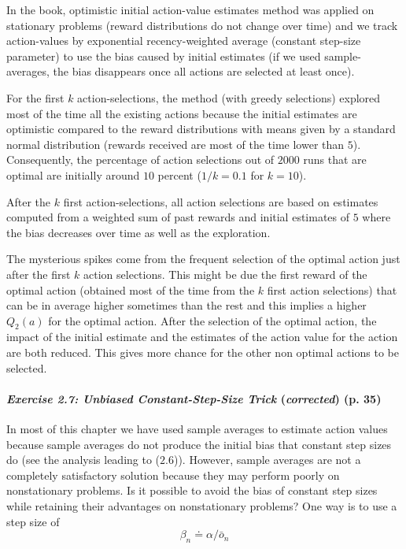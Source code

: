\documentclass[10pt,a4paper]{article}
\begin{document}
\bigskip
In the book, optimistic initial action-value estimates method was applied on stationary problems (reward distributions do not change over time) and we track action-values by exponential recency-weighted average (constant step-size parameter) to use the bias caused by initial estimates (if we used sample-averages, the bias disappears once all actions are selected at least once).

For the first $k$ action-selections, the method (with greedy selections) explored most of the time all the existing actions because the initial estimates are optimistic compared to the reward distributions with means given by a standard normal distribution (rewards received are most of the time lower than $5$). Consequently, the percentage of action selections out of $2000$ runs that are optimal are initially around $10$ percent ($1/k=0.1$ for $k=10$).

After the $k$ first action-selections, all action selections are based on estimates computed from a weighted sum of past rewards and initial estimates of $5$ where the bias decreases over time as well as the exploration.

The mysterious spikes come from the frequent selection of the optimal action just after the first $k$ action selections. This might be due the first reward of the optimal action (obtained most of the time from the $k$ first action selections) that can be in average higher sometimes than the rest and this implies a higher $Q_2(a)$ for the optimal action. After the selection of the optimal action, the impact of the initial estimate and the estimates of the action value for the action are both reduced. This gives more chance for the other non optimal actions to be selected.


\paragraph{\textit{Exercise 2.7: Unbiased Constant-Step-Size Trick} (\textit{corrected}) (p. 35)} In most of this chapter we have used
sample averages to estimate action values because sample averages do not produce the
initial bias that constant step sizes do (see the analysis leading to ($2.6$)). However, sample averages are not a completely satisfactory solution because they may perform poorly on nonstationary problems. Is it possible to avoid the bias of constant step sizes while retaining their advantages on nonstationary problems? One way is to use a step size of
\begin{equation}
\beta_n \doteq \alpha/\bar{o}_n
\end{equation}
\end{document}
